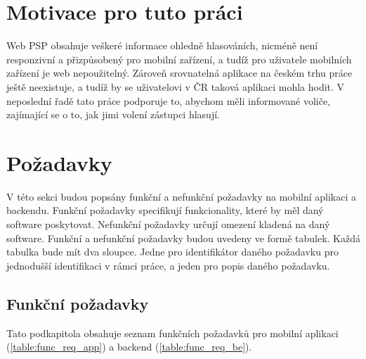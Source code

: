 \section{Motivace pro tuto práci}
Web PSP obsahuje veškeré informace ohledně hlasováních, nicméně není responzivní a přizpůsobený pro mobilní zařízení, a tudíž pro uživatele mobilních zařízení je web nepoužitelný. Zároveň srovnatelná aplikace na českém trhu práce ještě neexistuje, a tudíž by se uživatelovi v ČR taková aplikaci mohla hodit. V neposlední řadě tato práce podporuje to, abychom měli informované voliče, zajímající se o to, jak jimi volení zástupci hlasují.

\section{Požadavky}

V této sekci budou popsány funkční a nefunkční požadavky na mobilní aplikaci a backendu. Funkční požadavky specifikují funkcionality, které by měl daný software poskytovat. Nefunkční požadavky určují omezení kladená na daný software. Funkční a nefunkční požadavky budou uvedeny ve formě tabulek. Každá tabulka bude mít dva sloupce. Jedne pro identifikátor daného požadavku pro jednodušší identifikaci v rámci práce, a jeden pro popis daného požadavku.

\subsection{Funkční požadavky}
Tato podkapitola obsahuje seznam funkčních požadavků pro mobilní aplikaci (\ref{table:func_req_app}) a backend (\ref{table:func_req_be}).


